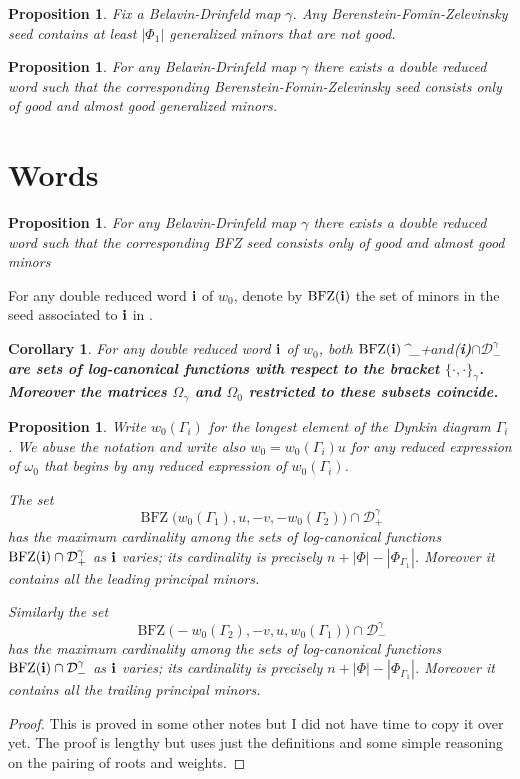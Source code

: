 \documentclass[a4paper]{amsart}
\newtheorem{proposition}[theorem]{Proposition}
\newtheorem{corollary}[theorem]{Corollary}
\theoremstyle{definition}
\begin{document}
\begin{proposition}
  Fix a Belavin-Drinfeld map $\gamma$. 
  Any Berenstein-Fomin-Zelevinsky seed contains at least $|\Phi_1|$ generalized minors that are not good.
\end{proposition}

\begin{proposition}
  For any Belavin-Drinfeld map $\gamma$ there exists a double reduced word such that the corresponding Berenstein-Fomin-Zelevinsky seed consists only of good and almost good generalized minors.
\end{proposition}


\section{Words}
\begin{proposition}
  For any Belavin-Drinfeld map $\gamma$ there exists a double reduced word such that the corresponding BFZ seed consists only of good and almost good minors
\end{proposition}


For any double reduced word $\bf{i}$ of $w_0$, denote by $\operatorname{BFZ}(\bf{i})$ the set of minors in the seed associated to $\bf{i}$ in \cite{BFZ05}.

\begin{corollary}
  For any double reduced word $\bf{i}$ of $w_0$, both  $\operatorname{BFZ}(\bf{i})$\cap{}^\gamma_+$ and $(\bf{i})$\cap\mathcal{D}^\gamma_-$ are sets of log-canonical functions with respect to the bracket $\{\cdot,\cdot\}_\gamma$.
  Moreover the matrices $\Omega_\gamma$ and $\Omega_0$ restricted to these subsets coincide.
\end{corollary}

\begin{proposition}
  Write $w_0(\Gamma_i)$ for the longest element of the Dynkin diagram $\Gamma_i$.
  We abuse the notation and write also $w_0=w_0(\Gamma_i)u$ for any reduced expression of $\omega_0$ that begins by any reduced expression of $w_0(\Gamma_i)$.

  The set
  \[
    \operatorname{BFZ}\big(w_0(\Gamma_1),u,-v,-w_0(\Gamma_2)\big)\cap\mathcal{D}^\gamma_+
  \]
  has the maximum cardinality among the sets of log-canonical functions $\operatorname{BFZ}(\bf{i})\cap\mathcal{D}^\gamma_+$ as $\bf{i}$ varies; its cardinality is precisely $n+|\Phi|-|\Phi_\Gamma_1|$. 
  Moreover it contains all the leading principal minors.

  Similarly the set
  \[
    \operatorname{BFZ}\big(-w_0(\Gamma_2),-v,u,w_0(\Gamma_1)\big)\cap\mathcal{D}^\gamma_-
  \]
  has the maximum cardinality among the sets of log-canonical functions $\operatorname{BFZ}(\bf{i})\cap\mathcal{D}^\gamma_-$ as $\bf{i}$ varies; its cardinality is precisely $n+|\Phi|-|\Phi_\Gamma_1|$. 
  Moreover it contains all the trailing principal minors.
\end{proposition}
\begin{proof}
  This is proved in some other notes but I did not have time to copy it over yet.
  The proof is lengthy but uses just the definitions and some simple reasoning on the pairing of roots and weights.
\end{proof}
\end{document}
